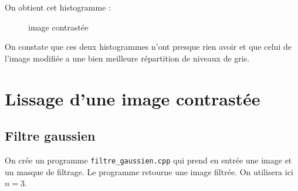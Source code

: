 \documentclass[french,a4paper,10pt]{article}
\begin{document}
    On obtient cet histogramme :
    \begin{figure}[!htb]
        \begin{minipage}{0.48\textwidth}
            \centering
            \caption{image contrastée}\label{Fig:peppersY-modif-10}
        \end{minipage}
    \end{figure}

    On constate que ces deux histogrammes n'ont presque rien avoir et que
    celui de l'image modifiée a une bien meilleure répartition de niveaux de gris.

    \newpage

    \section{Lissage d'une image contrastée}\label{sec:5}

    \subsection{Filtre gaussien}\label{subsec:4.2}

    On crée un programme \texttt{filtre\_gaussien.cpp} qui prend en entrée une image et un masque de filtrage.
    Le programme retourne une image filtrée. On utilisera ici $n=3$.
\end{document}

